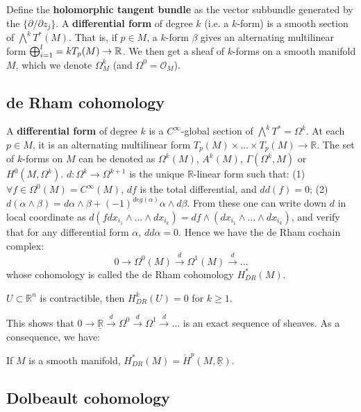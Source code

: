 Define the \textbf{holomorphic tangent bundle} as the vector subbundle generated by the $\{\partial/\partial z_j\}$. A \textbf{differential form} of degree $k$ (i.e. a $k$-form) is a smooth section of $\bigwedge^k T^*(M)$. That is, if $p\in M$, a $k$-form $\beta$ gives an alternating multilinear form $\bigoplus_{i=1}^l=k T_p(M)\to {\mathbb R}$. We then get a sheaf of $k$-forms on a smooth manifold $M$, which we denote $\Omega_M^k$ (and $\Omega^0=\mathcal{O}_M$). 

\subsection{de Rham cohomology}

A \textbf{differential form} of degree $k$ is a $C^\infty$-global section of $\bigwedge^kT^*=\Omega^k$. At each $p\in M$, it is an alternating multilinear form $T_p(M)\times\dots\times T_p(M)\rightarrow \mathbb{R}$. The set of $k$-forms on $M$ can be denoted as $\Omega^k(M)$, $A^k(M)$, $\Gamma(\Omega^k, M)$ or $H^0(M,\Omega^k)$. $d:\Omega^k\rightarrow\Omega^{k+1}$ is the unique $\mathbb{R}$-linear form such that: (1) $\forall f\in\Omega^0(M)=C^\infty(M)$, $df$ is the total differential, and $dd(f)=0$; (2) $d(\alpha\wedge\beta)=d\alpha\wedge\beta+(-1)^{deg(\alpha)}\alpha\wedge d\beta$. From these one can write down $d$ in local coordinate as $d(f dx_{i_1}\wedge\dots\wedge dx_{i_k})=df\wedge(dx_{i_1}\wedge\dots\wedge dx_{i_k})$, and verify that for any differential form $\alpha$, $dd\alpha=0$. Hence we have the de Rham cochain complex:
$$0\rightarrow\Omega^0(M)\xrightarrow{d}\Omega^1(M)\xrightarrow{d}\dots$$
whose cohomology is called the de Rham cohomology $H^*_{DR}(M)$. 

\begin{lemma} $U\subset\mathbb{R}^n$ is contractible, then $H^k_{DR}(U)=0$ for $k\geq 1$.
\end{lemma}
	
This shows that $0\rightarrow\underline{\mathbb{R}}\xrightarrow{d}\Omega^0\xrightarrow{d}\Omega^1\xrightarrow{d}\dots$ is an exact sequence of sheaves. As a consequence, we have:
\begin{theorem}
	If $M$ is a smooth manifold, $H^*_{DR}(M)=\check{H}^p(M,\underline{\mathbb{R}})$.
\end{theorem}

\subsection{Dolbeault cohomology}

